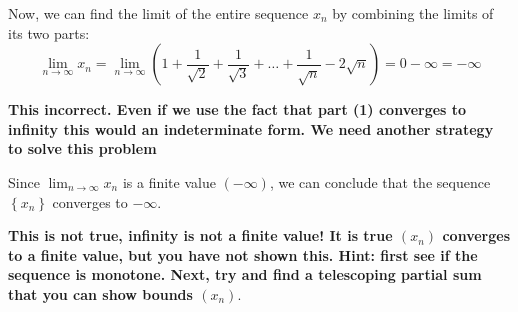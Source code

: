 \documentclass{report}
\begin{document}
Now, we can find the limit of the entire sequence $x_n$ by combining the limits of its two parts:
$$
\lim _{n \rightarrow \infty} x_n=\lim _{n \rightarrow \infty}\left(1+\frac{1}{\sqrt{2}}+\frac{1}{\sqrt{3}}+\ldots+\frac{1}{\sqrt{n}}-2 \sqrt{n}\right)=0-\infty=-\infty
$$

\textbf{This incorrect. Even if we use the fact that part (1) converges to infinity this would an indeterminate form. We need another strategy to solve this problem}

Since $\lim _{n \rightarrow \infty} x_n$ is a finite value $(-\infty)$, we can conclude that the sequence $\left\{x_n\right\}$ converges to $-\infty$.

\textbf{This is not true, infinity is not a finite value! It is true  $(x_n)$ converges to a finite value, but you have not shown this. Hint: first see if the sequence is monotone. Next, try and find a telescoping partial sum that you can show bounds $(x_n).$ }
\end{document}
